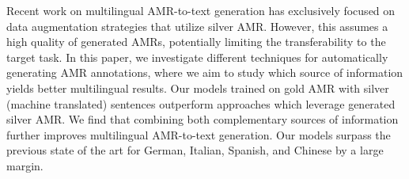 Recent work on multilingual AMR-to-text generation has exclusively focused on data augmentation strategies that utilize silver AMR. However, this assumes a high quality of generated AMRs, potentially limiting the transferability to the target task. In this paper, we investigate different techniques for automatically generating AMR annotations, where we aim to study which source of information yields better multilingual results. Our models trained on gold AMR with silver (machine translated) sentences outperform approaches which leverage generated silver AMR. We find that combining both complementary sources of information further improves multilingual AMR-to-text generation. Our models surpass the previous state of the art for German, Italian, Spanish, and Chinese by a large margin.
